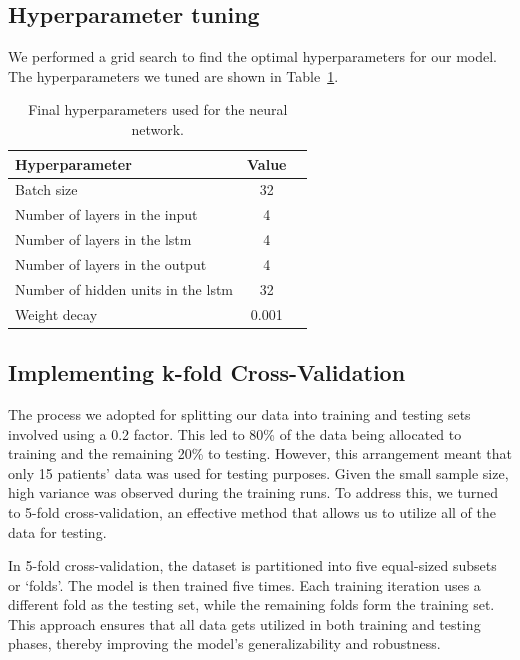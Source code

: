 \subsection{Hyperparameter tuning}

We performed a grid search to find the optimal hyperparameters for our model.
The hyperparameters we tuned are shown in
Table~\ref{tab:final-hyperparameters}.

\begin{table}[h]
	\centering
	\begin{tabular}{l c c}
		\toprule
		\textbf{Hyperparameter}                  & \textbf{Value} \\
		\midrule
		Batch size                               & 32             \\
		Number of layers in the input            & 4              \\
		Number of layers in the \gls{lstm}       & 4              \\
		Number of layers in the output           & 4              \\
		Number of hidden units in the \gls{lstm} & 32             \\
		Weight decay                             & 0.001          \\
		\bottomrule
	\end{tabular}
	\caption{Final hyperparameters used for the neural network.}
	\label{tab:final-hyperparameters}
\end{table}

\subsection{Implementing k-fold Cross-Validation}

The process we adopted for splitting our data into training and testing sets
involved using a 0.2 factor. This led to 80\% of the data being allocated to
training and the remaining 20\% to testing. However, this arrangement meant
that only 15 patients' data was used for testing purposes. Given the small
sample size, high variance was observed during the training runs. To address
this, we turned to 5-fold cross-validation, an effective method that allows us
to utilize all of the data for testing.

In 5-fold cross-validation, the dataset is partitioned into five equal-sized
subsets or `folds'. The model is then trained five times. Each training
iteration uses a different fold as the testing set, while the remaining folds
form the training set. This approach ensures that all data gets utilized in
both training and testing phases, thereby improving the model's
generalizability and robustness.


